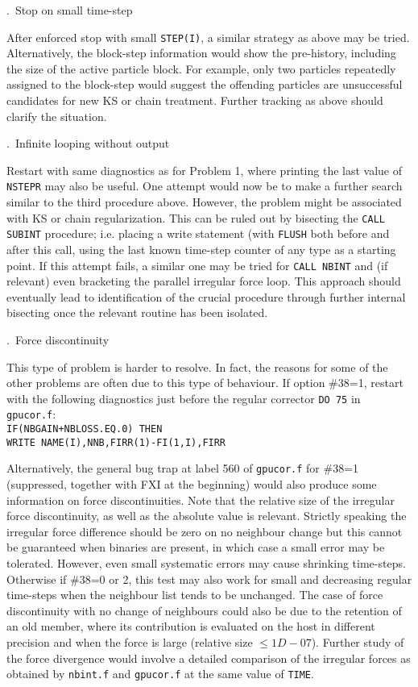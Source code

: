 \documentclass[12pt]{article}
\begin{document}
\bigskip
{}.~Stop on small time-step

\medskip
After enforced stop with small {\tt STEP(I)}, a similar strategy as above may be tried.
Alternatively, the block-step information would show the pre-history, including the
size of the active particle block.
For example, only two particles repeatedly assigned to the block-step would suggest
the offending particles are unsuccessful candidates for new KS or chain treatment.
Further tracking as above should clarify the situation.

\bigskip
{}.~Infinite looping without output

\medskip
Restart with same diagnostics as for Problem 1, where printing the last value of
{\tt NSTEPR} may also be useful.
One attempt would now be to make a further search similar to the third procedure above.
However, the problem might be associated with KS or chain regularization.
This can be ruled out by bisecting the {\tt CALL SUBINT} procedure; i.e. placing
a write statement (with {\tt FLUSH} both before and after this call, using the
last known time-step counter of any type as a starting point.
If this attempt fails, a similar one may be tried for {\tt CALL NBINT} and
(if relevant) even bracketing the parallel irregular force loop.
This approach should eventually lead to identification of the crucial procedure
through further internal bisecting once the relevant routine has been isolated.

\bigskip
{}.~Force discontinuity

\medskip
This type of problem is harder to resolve.
In fact, the reasons for some of the other problems are often due to this type of behaviour.
If option \#38=1, restart with the following diagnostics just before the regular
corrector {\tt DO 75} in {\tt gpucor.f}:  \\
\noindent
{\tt IF(NBGAIN+NBLOSS.EQ.0) THEN} \\
\noindent
{\tt WRITE NAME(I),NNB,FIRR(1)-FI(1,I),FIRR}

Alternatively, the general bug trap at label 560 of {\tt gpucor.f} for \#38=1 (suppressed,
together with FXI at the beginning) would also produce some information on force
discontinuities.
Note that the relative size of the irregular force discontinuity, as well as the absolute
value is relevant.
Strictly speaking the irregular force difference should be zero on no neighbour change
but this cannot be guaranteed when binaries are present, in which case a small error
may be tolerated.
However, even small systematic errors may cause shrinking time-steps.
Otherwise if \#38=0 or 2, this test may also work for small and decreasing regular
time-steps when the neighbour list tends to be unchanged.
The case of force discontinuity with no change of neighbours could also be due to the
retention of an old member, where its contribution is evaluated on the host in
different precision and when the force is large (relative size $\le 1D-07$).
Further study of the force divergence would involve a detailed comparison of the
irregular forces as obtained by {\tt nbint.f} and {\tt gpucor.f} at the same value of
{\tt TIME}.
\end{document}
